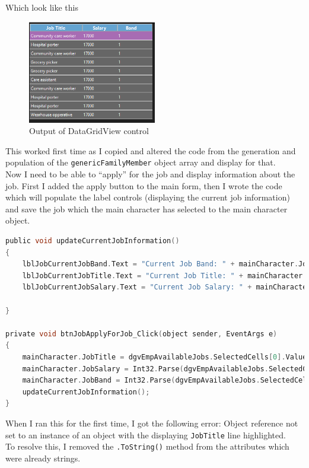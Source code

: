 Which look like this
\begin{figure}[H]
    \centering
    \includegraphics[width=0.5\textwidth]{images/implementation/jobs3.png}
    \caption{Output of DataGridView control}
    \label{fig:implementation-jobs3}
\end{figure}
\noindent This worked first time as I copied and altered the code from the generation and population of the \verb|genericFamilyMember| object array and display for that.\\
Now I need to be able to “apply” for the job and display information about the job. First I added the apply button to the main form, then I wrote the code which will populate the label controls (displaying the current job information) and save the job which the main character has selected to the main character object.
\begin{lstlisting}[language=c, style=csharp, caption=Applying for job and updating job information procedures]
public void updateCurrentJobInformation()
{
    lblJobCurrentJobBand.Text = "Current Job Band: " + mainCharacter.JobBand.ToString();
    lblJobCurrentJobTitle.Text = "Current Job Title: " + mainCharacter.JobTitle.ToString();
    lblJobCurrentJobSalary.Text = "Current Job Salary: " + mainCharacter.JobSalary.ToString();

}

private void btnJobApplyForJob_Click(object sender, EventArgs e)
{
    mainCharacter.JobTitle = dgvEmpAvailableJobs.SelectedCells[0].Value.ToString();
    mainCharacter.JobSalary = Int32.Parse(dgvEmpAvailableJobs.SelectedCells[1].Value.ToString());
    mainCharacter.JobBand = Int32.Parse(dgvEmpAvailableJobs.SelectedCells[2].Value.ToString());
    updateCurrentJobInformation();
}
\end{lstlisting}
When I ran this for the first time, I got the following error: Object reference not set to an instance of an object with the displaying \verb|JobTitle| line highlighted.\\
To resolve this, I removed the \verb|.ToString()| method from the attributes which were already strings.
